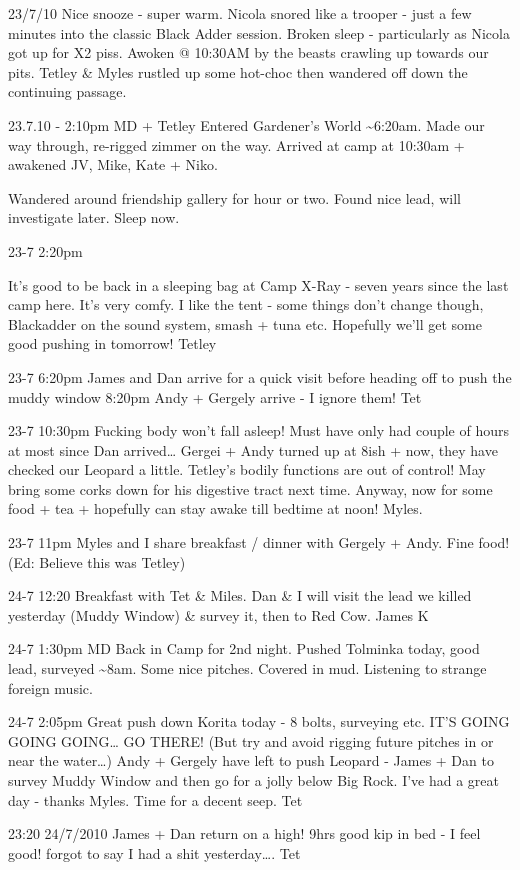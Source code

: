 23/7/10 Nice snooze - super warm. Nicola snored like a trooper - just a
few minutes into the classic Black Adder session. Broken sleep -
particularly as Nicola got up for X2 piss. Awoken @ 10:30AM by the
beasts crawling up towards our pits. Tetley \& Myles rustled up some
hot-choc then wandered off down the continuing passage.

23.7.10 - 2:10pm MD + Tetley Entered Gardener's World
\textasciitilde{}6:20am. Made our way through, re-rigged zimmer on the
way. Arrived at camp at 10:30am + awakened JV, Mike, Kate + Niko.

Wandered around friendship gallery for hour or two. Found nice lead,
will investigate later. Sleep now.

23-7 2:20pm

It's good to be back in a sleeping bag at Camp X-Ray - seven years since
the last camp here. It's very comfy. I like the tent - some things don't
change though, Blackadder on the sound system, smash + tuna etc.
Hopefully we'll get some good pushing in tomorrow! Tetley

23-7 6:20pm James and Dan arrive for a quick visit before heading off to
push the muddy window 8:20pm Andy + Gergely arrive - I ignore them! Tet

23-7 10:30pm Fucking body won't fall asleep! Must have only had couple
of hours at most since Dan arrived\ldots{} Gergei + Andy turned up at
8ish + now, they have checked our Leopard a little. Tetley's bodily
functions are out of control! May bring some corks down for his
digestive tract next time. Anyway, now for some food + tea + hopefully
can stay awake till bedtime at noon! Myles.

23-7 11pm Myles and I share breakfast / dinner with Gergely + Andy. Fine
food! (Ed: Believe this was Tetley)

24-7 12:20 Breakfast with Tet \& Miles. Dan \& I will visit the lead we
killed yesterday (Muddy Window) \& survey it, then to Red Cow. James K

24-7 1:30pm MD Back in Camp for 2nd night. Pushed Tolminka today, good
lead, surveyed \textasciitilde{}8am. Some nice pitches. Covered in mud.
Listening to strange foreign music.

24-7 2:05pm Great push down Korita today - 8 bolts, surveying etc. IT'S
GOING GOING GOING\ldots{} GO THERE! (But try and avoid rigging future
pitches in or near the water\ldots{}) Andy + Gergely have left to push
Leopard - James + Dan to survey Muddy Window and then go for a jolly
below Big Rock. I've had a great day - thanks Myles. Time for a decent
seep. Tet

23:20 24/7/2010 James + Dan return on a high! 9hrs good kip in bed - I
feel good! forgot to say I had a shit yesterday\ldots{}. Tet
